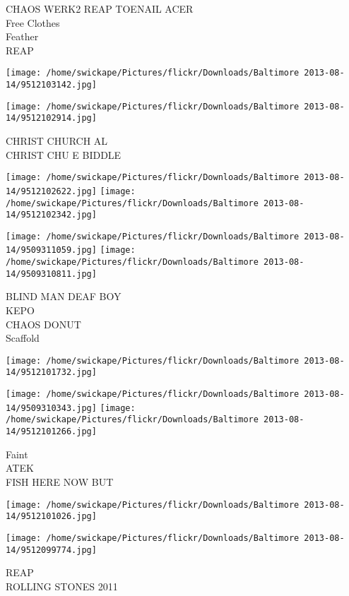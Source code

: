 \documentclass[10pt,letterpaper]{article}
\begin{document}
CHAOS WERK2 REAP TOENAIL ACER\\
Free Clothes\\
Feather\\
REAP\\
\pagebreak

\texttt{[image: /home/swickape/Pictures/flickr/Downloads/Baltimore 2013-08-14/9512103142.jpg]}

\vspace{0.25in}
\texttt{[image: /home/swickape/Pictures/flickr/Downloads/Baltimore 2013-08-14/9512102914.jpg]}

CHRIST CHURCH AL\\
CHRIST CHU E BIDDLE\\
\pagebreak

\texttt{[image: /home/swickape/Pictures/flickr/Downloads/Baltimore 2013-08-14/9512102622.jpg]}
\texttt{[image: /home/swickape/Pictures/flickr/Downloads/Baltimore 2013-08-14/9512102342.jpg]}

\texttt{[image: /home/swickape/Pictures/flickr/Downloads/Baltimore 2013-08-14/9509311059.jpg]}
\texttt{[image: /home/swickape/Pictures/flickr/Downloads/Baltimore 2013-08-14/9509310811.jpg]}

BLIND MAN DEAF BOY\\
KEPO\\
CHAOS DONUT\\
Scaffold\\
\pagebreak

\texttt{[image: /home/swickape/Pictures/flickr/Downloads/Baltimore 2013-08-14/9512101732.jpg]}

\vspace{0.25in}
\texttt{[image: /home/swickape/Pictures/flickr/Downloads/Baltimore 2013-08-14/9509310343.jpg]}
\texttt{[image: /home/swickape/Pictures/flickr/Downloads/Baltimore 2013-08-14/9512101266.jpg]}

Faint\\
ATEK\\
FISH HERE NOW BUT\\
\pagebreak

\texttt{[image: /home/swickape/Pictures/flickr/Downloads/Baltimore 2013-08-14/9512101026.jpg]}

\vspace{0.25in}
\texttt{[image: /home/swickape/Pictures/flickr/Downloads/Baltimore 2013-08-14/9512099774.jpg]}

REAP\\
ROLLING STONES 2011\\
\pagebreak
\end{document}
